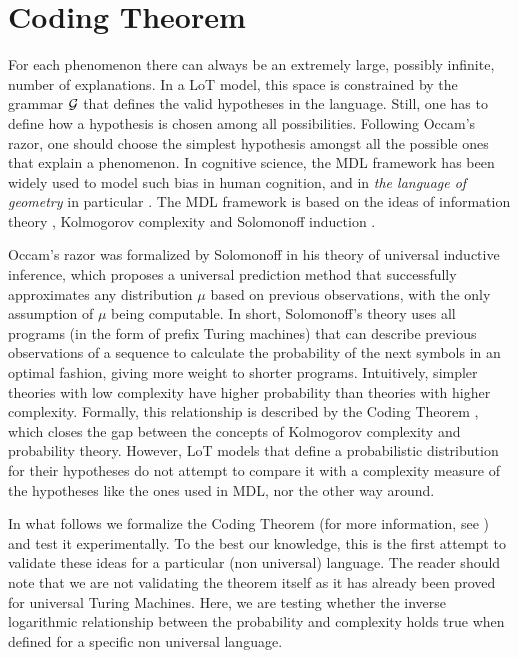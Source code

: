 \section{Coding Theorem}
\label{sec:coding}

For each phenomenon there can always be an extremely large, possibly infinite, number of explanations. In a LoT model, this space is constrained by the grammar $\gram$ that defines the valid hypotheses in the language. Still, one has to define how a hypothesis is chosen among all possibilities. Following Occam's razor, one should choose the simplest hypothesis amongst all the possible ones that explain a phenomenon. In cognitive science, the MDL framework has been widely used to model such bias in human cognition, and in \textit{the language of geometry} in particular \cite{marie2016}. The MDL framework is based on the ideas of information theory \cite{shannon48}, Kolmogorov complexity \cite{kolmogorov1968three} and Solomonoff induction \cite{solomonoff1964formal}.

Occam's razor was formalized by Solomonoff \cite{solomonoff1964formal} in his theory of universal inductive inference, which proposes a universal prediction method that successfully approximates any distribution $\mu$ based on previous observations, with the only assumption of $\mu$ being computable. In short, Solomonoff's theory uses all programs (in the form of prefix Turing machines) that can describe previous observations of a sequence to calculate the probability of the next symbols in an optimal fashion, giving more weight to shorter programs. Intuitively, simpler theories with low complexity have higher probability than theories with higher complexity. Formally, this relationship is described by the Coding Theorem \cite{levin1974laws}, which closes the gap between the concepts of Kolmogorov complexity and probability theory. However, LoT models that define a probabilistic distribution for their hypotheses do not attempt to compare it with a complexity measure of the hypotheses like the ones used in MDL, nor the other way around.

In what follows we formalize the Coding Theorem (for more information, see \cite{li2013introduction}) and test it experimentally. To the best our knowledge, this is the first attempt to validate these ideas for a particular (non universal) language. The reader should note that we are not validating the theorem itself as it has already been proved for universal Turing Machines. Here, we are testing whether the inverse logarithmic relationship between the probability and complexity holds true when defined for a specific non universal language.

